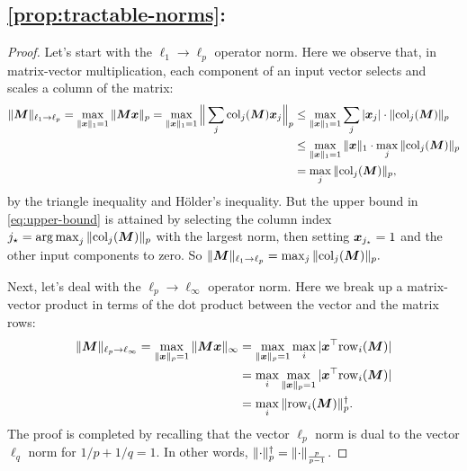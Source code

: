 \subsection*{\cref{prop:tractable-norms}: } \label{proof:tractable-norms}

\begin{proof}
Let's start with the $\ell_1\to\ell_p$ operator norm. Here we observe that, in matrix-vector multiplication, each component of an input vector selects and scales a column of the matrix:
\begin{align}
    \Vert {{\bm{M}}} \Vert_{\ell_1 \to \ell_p} = \max_{\Vert {{\bm{x}}} \Vert_1 = 1} \Vert {{\bm{M}}{\bm{x}}} \Vert_p = \max_{\Vert {{\bm{x}}} \Vert_1 = 1} \Big\|\sum_j \mathrm{col}_j({\bm{M}}) {\bm{x}}_j\Big\|_p &\leq \max_{\Vert {{\bm{x}}} \Vert_1 = 1} \sum_j \vert {{\bm{x}}_j} \vert\cdot \Vert {\mathrm{col}_j({\bm{M}})} \Vert_p\\
    &\leq \max_{\Vert {{\bm{x}}} \Vert_1 = 1} \Vert {{\bm{x}}} \Vert_1 \cdot \max_j \Vert {\mathrm{col}_j({\bm{M}})} \Vert_p\\
    &= \max_j \Vert {\mathrm{col}_j({\bm{M}})} \Vert_p,\label{eq:upper-bound}
\end{align}
by the triangle inequality and H\"older's inequality. But the upper bound in \cref{eq:upper-bound} is attained by selecting the column index $j_\star = \operatorname*{arg\,max}_j \Vert {\mathrm{col}_j({\bm{M}})} \Vert_p$ with the largest norm, then setting ${\bm{x}}_{j_\star}=1$ and the other input components to zero. So $\Vert {{\bm{M}}} \Vert_{\ell_1 \to \ell_p} = \max_j \Vert {\mathrm{col}_j({\bm{M}})} \Vert_p.$

Next, let's deal with the $\ell_p \to \ell_\infty$ operator norm. Here we break up a matrix-vector product in terms of the dot product between the vector and the matrix rows:
\begin{align}
    \Vert {{\bm{M}}} \Vert_{\ell_p \to \ell_\infty} = \max_{\Vert {{\bm{x}}} \Vert_p = 1} \Vert {{\bm{M}}{\bm{x}}} \Vert_\infty &= \max_{\Vert {{\bm{x}}} \Vert_p = 1} \max_i \vert {{\bm{x}}^\top \mathrm{row}_i({\bm{M}}) } \vert \\
    &= \max_i \max_{\Vert {{\bm{x}}} \Vert_p = 1} \vert {{\bm{x}}^\top \mathrm{row}_i({\bm{M}}) } \vert \\
    &= \max_i \Vert {\mathrm{row}_i({\bm{M}})} \Vert_p^\dagger.
\end{align}
The proof is completed by recalling that the vector $\ell_p$ norm is dual to the vector $\ell_q$ norm for $1/p + 1/q =1$. In other words, $\Vert {\cdot} \Vert_p^\dagger = \Vert {\cdot} \Vert_{\frac{p}{p-1}}$.
\end{proof}
